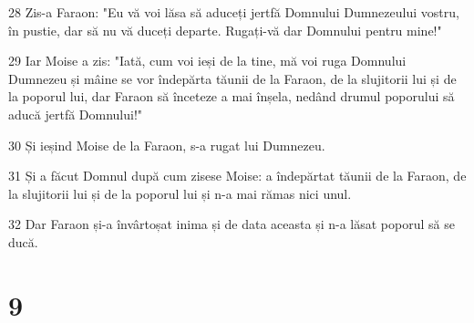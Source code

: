 \par 28 Zis-a Faraon: "Eu vă voi lăsa să aduceți jertfă Domnului Dumnezeului vostru, în pustie, dar să nu vă duceți departe. Rugați-vă dar Domnului pentru mine!"
\par 29 Iar Moise a zis: "Iată, cum voi ieși de la tine, mă voi ruga Domnului Dumnezeu și mâine se vor îndepărta tăunii de la Faraon, de la slujitorii lui și de la poporul lui, dar Faraon să înceteze a mai înșela, nedând drumul poporului să aducă jertfă Domnului!"
\par 30 Și ieșind Moise de la Faraon, s-a rugat lui Dumnezeu.
\par 31 Și a făcut Domnul după cum zisese Moise: a îndepărtat tăunii de la Faraon, de la slujitorii lui și de la poporul lui și n-a mai rămas nici unul.
\par 32 Dar Faraon și-a învârtoșat inima și de data aceasta și n-a lăsat poporul să se ducă.

\chapter{9}

